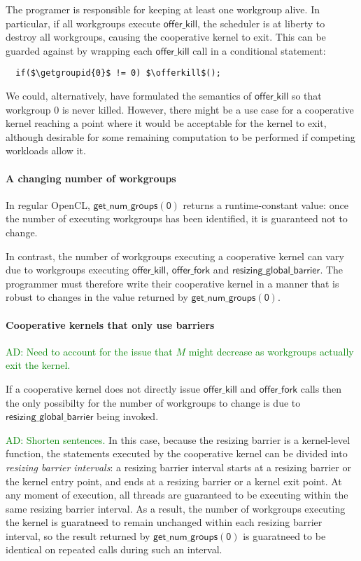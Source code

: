 \documentclass[nocopyrightspace]{sigplanconf-pldi16}
\newcommand{\ADComment}[1]{\textcolor{green}{AD: #1}}
\newcommand{\offerfork}{\mathsf{offer\_fork}}
\newcommand{\offerkill}{\mathsf{offer\_kill}}
\newcommand{\resizingglobalbarrier}{\mathsf{resizing\_global\_barrier}}
\newcommand{\getgroupid}[1]{\mathsf{get\_group\_id(#1)}}
\newcommand{\getnumgroups}[1]{\mathsf{get\_num\_groups(#1)}}
\begin{document}
The programer is responsible for keeping at least one workgroup alive.  In particular, if all workgroups execute $\offerkill$, the scheduler is at liberty to destroy all workgroups, causing the cooperative kernel to exit.  This can be guarded against by wrapping each $\offerkill$ call in a conditional statement:

\lstset{basicstyle=\tt}
\begin{lstlisting}
  if($\getgroupid{0}$ != 0) $\offerkill$();
\end{lstlisting}
\lstset{basicstyle=\scriptsize\tt}

We could, alternatively, have formulated the semantics of $\offerkill$
so that workgroup 0 is never killed.  However, there might be a use
case for a cooperative kernel reaching a point where it would be
acceptable for the kernel to exit, although desirable for some
remaining computation to be performed if competing workloads allow it.

\paragraph{A changing number of workgroups}

In regular OpenCL, $\getnumgroups{0}$ returns a runtime-constant
value: once the number of executing workgroups has been identified, it
is guaranteed not to change.

In contrast, the number of workgroups executing a cooperative kernel
can vary due to workgroups executing $\offerkill$, $\offerfork$ and
$\resizingglobalbarrier$.  The programmer must therefore write their
cooperative kernel in a manner that is robust to changes in the value
returned by $\getnumgroups{0}$.

\paragraph{Cooperative kernels that only use barriers}

\ADComment{Need to account for the issue that $M$ might decrease as
  workgroups actually exit the kernel.}

If a cooperative kernel does not directly issue $\offerkill$ and
$\offerfork$ calls then the only possibilty for the number of
workgroups to change is due to $\resizingglobalbarrier$ being invoked.

\ADComment{Shorten sentences.}
In this case, because the resizing barrier is a kernel-level function,
the statements executed by the cooperative kernel can be divided into
\emph{resizing barrier intervals}: a resizing barrier interval starts
at a resizing barrier or the kernel entry point, and ends at a
resizing barrier or a kernel exit point.  At any moment of execution,
all threads are guaranteed to be executing within the same resizing
barrier interval.  As a result, the number of workgroups executing the
kernel is guaratneed to remain unchanged within each resizing barrier
interval, so the result returned by $\getnumgroups{0}$ is guaratneed
to be identical on repeated calls during such an interval.
\end{document}
